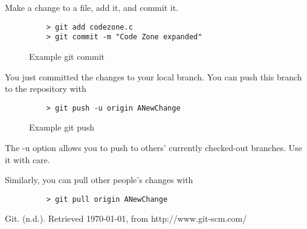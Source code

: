 \documentclass[11pt]{report}
\begin{document}
Make a change to a file, add it, and commit it.

\begin{figure}[H]
  \caption{Example git commit}
  \begin{lstlisting}
    > git add codezone.c
    > git commit -m "Code Zone expanded"
    \end{lstlisting}
\end{figure}

You just committed the changes to your local branch.  You can push
this branch to the repository with

\begin{figure}[H]
  \caption{Example git push}
  \begin{lstlisting}
    > git push -u origin ANewChange
  \end{lstlisting}
\end{figure}

The -u option allows you to push to others' currently checked-out
branches. Use it with care.

Similarly, you can pull other people's changes with

\begin{figure}[H]
  \begin{lstlisting}
    > git pull origin ANewChange
  \end{lstlisting}
\end{figure}

\begin{thebibliography}{9}

    Git. (n.d.). Retrieved \today, from http://www.git-scm.com/

\end{thebibliography}
\end{document}
